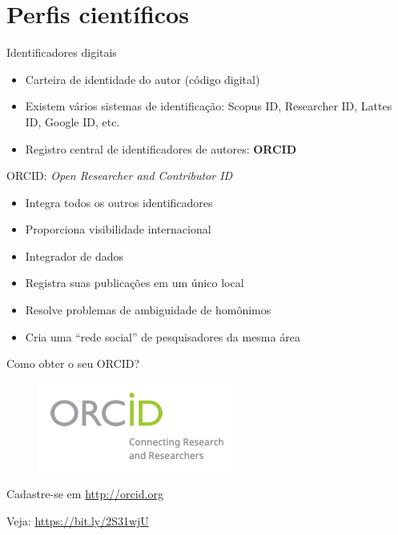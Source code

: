 \section{Perfis científicos}

\begin{frame}{Identificadores digitais}
\begin{itemize}
\item Carteira de identidade do autor (código digital)
\item Existem vários sistemas de identificação: Scopus ID, Researcher ID, Lattes ID, Google ID, etc.
\item Registro central de identificadores de autores: \textbf{ORCID}
\end{itemize}
\end{frame}


\begin{frame}{ORCID: \textit{Open Researcher and Contributor ID}}
\begin{itemize}
\item Integra todos os outros identificadores
\item Proporciona visibilidade internacional 
\item Integrador de dados
\item Registra suas publicações em um único local
\item Resolve problemas de ambiguidade de homônimos
\item Cria uma ``rede social'' de pesquisadores da mesma área
\end{itemize}
\end{frame}

\begin{frame}{Como obter o seu ORCID?}
\begin{figure}
\centering
\includegraphics[scale=0.6]{figs/02/orcid}
\end{figure}

Cadastre-se em \url{http://orcid.org}

\scriptsize{Veja: \url{https://bit.ly/2S31wjU}}

\end{frame}

